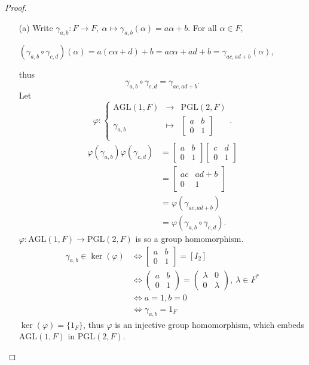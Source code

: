 \documentclass[11pt,a4paper]{article}
\begin{document}
\begin{proof}
\begin{enumerate}
\item[(a)]
Write
$\gamma_{a,b} : F\to F,\  \alpha \mapsto \gamma_{a,b}(\alpha) = a\alpha+b$.
For all $\alpha \in F,$

$(\gamma_{a,b} \circ \gamma_{c,d})(\alpha) = a(c\alpha+d)+b=ac \alpha +ad+b = \gamma_{ac,ad+b}(\alpha)$, 

thus
$$\gamma_{a,b} \circ \gamma_{c,d} = \gamma_{ac,ad+b}.$$
Let 
$$
\varphi :
\left\{
\begin{array}{ccc}
 \mathrm{AGL}(1,F) &   \to & \mathrm{PGL}(2,F)  \\
  \gamma_{a,b}& \mapsto  &  \left[
\begin{array}{ccc}
 a &   b   \\
  0&   1      
\end{array}
\right] \\
\end{array}
 \right.
.
$$
\begin{align*}
\varphi(\gamma_{a,b}) \varphi( \gamma_{c,d}) &=
\left[
 \begin{array}{ccc}
 a &   b   \\
  0&   1      
\end{array}
\right] 
\left[
\begin{array}{ccc}
 c &   d   \\
  0&   1      
\end{array}
\right] \\
&=
\left[
\begin{array}{ccc}
 ac &   ad+b   \\
  0&   1      
\end{array}
\right] \\
&=\varphi( \gamma_{ac,ad+b})\\
&=\varphi(\gamma_{a,b} \circ \gamma_{c,d}).
\end{align*}
$\varphi :  \mathrm{AGL}(1,F)    \to  \mathrm{PGL}(2,F)$ is so a group homomorphism.
\begin{align*}
\gamma_{a,b} \in \ker(\varphi)& \iff 
\left[
 \begin{array}{ccc}
 a &   b   \\
  0&   1      
\end{array}
\right] =[I_2]\\
& \iff 
\left(
 \begin{array}{ccc}
 a &   b   \\
  0&   1      
\end{array}
\right) = 
\left(
 \begin{array}{ccc}
 \lambda&   0   \\
  0&   \lambda      
\end{array}
\right),
\ \lambda \in F^*\\
&\iff a=1, b=0\\
&\iff \gamma_{a,b} = 1_F
\end{align*}
$\ker(\varphi) = \{1_F\}$, thus $\varphi$ is an injective group homomorphism, which embeds  $\mathrm{AGL}(1,F)$ in $ \mathrm{PGL}(2,F)$.


\end{enumerate}
\end{proof}
\end{document}
